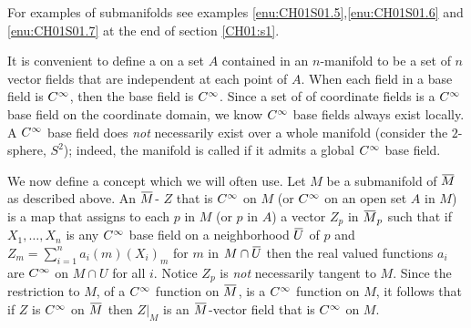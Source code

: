\documentclass[../main]{subfiles}
\begin{document}
For examples of submanifolds see examples \ref{enu:CH01S01.5},\ref{enu:CH01S01.6} and \ref{enu:CH01S01.7} at the end of section \ref{CH01:s1}.

It is convenient to define a  on a set $A$ contained in an $n$-manifold to be a set of $n$ vector fields that are independent at each point of $A$. When each field in a base field is $C^\infty$, then the base field is $C^\infty$. Since a set of of coordinate fields is a $C^\infty$ base field on the coordinate domain, we know $C^\infty$ base fields always exist locally. A $C^\infty$ base field does \emph{not} necessarily exist over a whole manifold (consider the $2$-sphere, $S^2$); indeed, the manifold is called  if it admits a global $C^\infty$ base field.

We now define a concept which we will often use. Let $M$ be a submanifold of $\xoverline{M}$ as described above. An $\xoverline{M}$- $Z$ that is $C^\infty$ on $M$ (or $C^\infty$ on an open set $A$ in $M$) is a map that assigns to each $p$ in $M$ (or $p$ in $A$) a vector $Z_p$ in $\xoverline{M}_p$ such that if $X_1, \dots, X_n$ is any $C^\infty$ base field on a neighborhood $\xoverline{U}$ of $p$ and $Z_m = \sum_{i=1} ^n a_i (m)(X_i)_m$ for $m$ in $M \cap \xoverline{U}$ then the real valued functions $a_i$ are $C^\infty$ on $M \cap U$ for all $i$. Notice $Z_p$ is \emph{not} necessarily tangent to $M$. Since the restriction to $M$, of a $C^\infty$ function on $\xoverline{M}$, is a $C^\infty$ function on $M$, it follows that if $Z$ is $C^\infty$ on $\xoverline{M}$ then $Z|_M$ is an $\xoverline{M}$-vector field that is $C^\infty$ on $M$.
\end{document}
